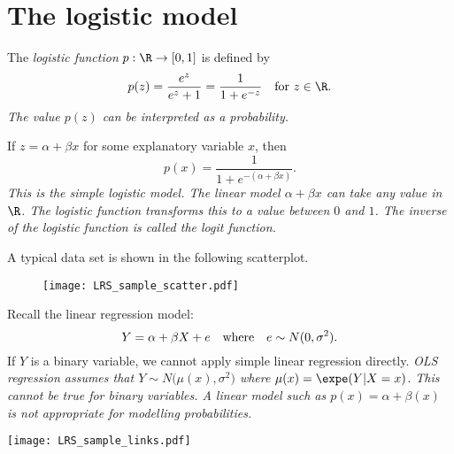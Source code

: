 
\section{The logistic model}
The \emph{logistic function} $p:\R\to[0,1]$ is defined by 
\[
p(z) =\frac{e^z}{e^z+1} = \frac{1}{1+e^{-z}}	\text{\quad for $z\in\R$.}
\]
\bit
\it The value $p(z)$ can be interpreted as a probability.
\eit

\vspace*{2ex}
If $z = \alpha + \beta x$ for some explanatory variable $x$, then
\[
p(x) 
	= \frac{1}{1+e^{-(\alpha+\beta x)}}.
\]
\bit
\it This is the \emph{simple logistic model}.
\it The linear model $\alpha+\beta x$ can take any value in $\R$.
\it The logistic function transforms this to a value between $0$ and $1$.
\it The inverse of the logistic function is called the \emph{logit} function.
\eit




A typical data set is shown in the following scatterplot.
\vspace*{-8ex}
\begin{figure}[ht]
\centering
\texttt{[image: LRS\_sample\_scatter.pdf]}
\end{figure}
\vspace*{-8ex}

Recall the linear regression model:
\[
Y = \alpha + \beta X + e \text{\quad where\quad} e\sim N(0,\sigma^2).
\]
If $Y$ is a binary variable, we cannot apply simple linear regression directly.
\bit
\it OLS regression assumes that $Y\sim N\big(\mu(x),\sigma^2\big)$ where $\mu(x) = \expe(Y|X=x)$.
\it This cannot be true for binary variables.
\it A linear model such as $p(x)=\alpha+\beta(x)$ is not appropriate for modelling probabilities.
\eit



\begin{center}
\texttt{[image: LRS\_sample\_links.pdf]}
\end{center}
\vspace*{-2ex}

